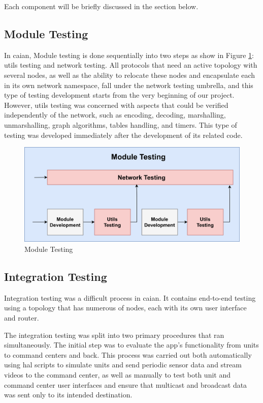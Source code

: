 Each component will be briefly discussed in the section below.

\subsection{Module Testing}
In \acrshort{caian}, Module testing is done sequentially into two steps as show in Figure \ref{fig:module-testing}: \acrshort{utils} testing and network testing. All protocols that need an active topology with several nodes, as well as the ability to relocate these nodes and encapsulate each in its own network namespace, fall under the network testing umbrella, and this type of testing development starts from the very beginning of our project. However, \acrshort{utils} testing was concerned with aspects that could be verified independently of the network, such as encoding, decoding, marshalling, unmarshalling, graph algorithms, tables handling, and timers. This type of testing was developed immediately after the development of its related code.

\begin{figure}
    \centering
    \includegraphics[width=15cm]{images/module-testing.png}
    \caption{Module Testing}
    \label{fig:module-testing}
\end{figure}


\subsection{Integration Testing}
Integration testing was a difficult process in \acrshort{caian}. It contains end-to-end testing using a topology that has numerous of nodes, each with its own user interface and router.

The integration testing was split into two primary procedures that ran simultaneously. The initial step was to evaluate the app's functionality from units to command centers and back. This process was carried out both automatically using \acrshort{hal} scripts to simulate units and send periodic sensor data and stream videos to the command center, as well as manually to test both unit and command center user interfaces and ensure that multicast and broadcast data was sent only to its intended destination.

